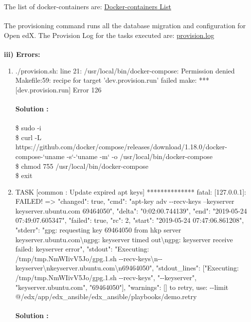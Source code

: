 \documentclass[12pt]{report}
\begin{document}
The list of docker-containers are: \href{https://github.com/fresearchgroup/Configurable-and-Scalable-IITBombayX-MOOC-platform-on-Commodity-Servers/tree/master/Docker\%20Containers}{Docker-containers List}\cite{Cont}
\\\\
The provisioning command runs all the database migration and configuration for Open edX. The Provision Log for the tasks executed are: \href{https://github.com/fresearchgroup/Configurable-and-Scalable-IITBombayX-MOOC-platform-on-Commodity-Servers/tree/master/Provision\%20log}{provision.log}\cite{Provision}\\\\
\textbf{iii) Errors:}
\begin{enumerate}
	\item  ./provision.sh: line 21: /usr/local/bin/docker-compose: Permission denied
	Makefile:59: recipe for target 'dev.provision.run' failed
	make: *** [dev.provision.run] Error 126\\\\
	\textbf{Solution :}\\\\
	\$ sudo -i\\
	\$ curl -L https://github.com/docker/compose/releases/download/1.18.0/docker-compose-`uname -s`-`uname -m` -o /usr/local/bin/docker-compose\\
	\$ chmod 755 /usr/local/bin/docker-compose\\
	\$ exit
	\item TASK [common : Update expired apt keys] **************
	fatal: [127.0.0.1]: FAILED! => {"changed": true, "cmd": "apt-key adv -{}-recv-keys --keyserver keyserver.ubuntu.com 69464050", "delta": "0:02:00.744139", "end": "2019-05-24 07:49:07.605347", "failed": true, "rc": 2, "start": "2019-05-24 07:47:06.861208", "stderr": "gpg: requesting key 69464050 from hkp server keyserver.ubuntu.com\textbackslash ngpg: keyserver timed out\textbackslash ngpg: keyserver receive failed: keyserver error", "stdout": "Executing: /tmp/tmp.NmWIivV5Jo/gpg.1.sh -{}-recv-keys\textbackslash n-{}-keyserver\textbackslash nkeyserver.ubuntu.com\textbackslash n69464050", "stdout\_lines": ["Executing: /tmp/tmp.NmWIivV5Jo/gpg.1.sh -{}-recv-keys", "-{}-keyserver", "keyserver.ubuntu.com", "69464050"], "warnings": []}
	to retry, use: -{}-limit @/edx/app/edx\_ansible/edx\_ansible/playbooks/demo.retry\\\\
	\textbf{Solution :}\\\\

\end{enumerate}
\end{document}

